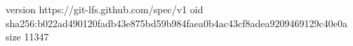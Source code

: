 version https://git-lfs.github.com/spec/v1
oid sha256:b022ad490120fadb43e875bd59b984faea0b4ac43cf8adea9209469129c40e0a
size 11347

